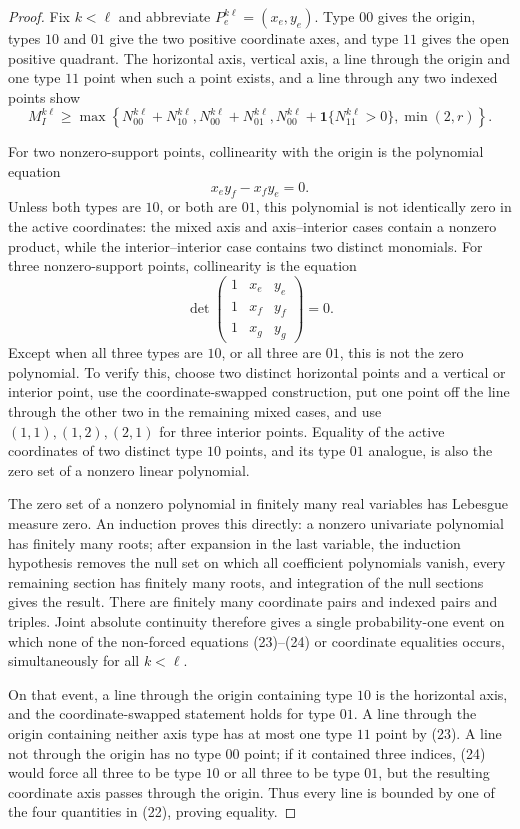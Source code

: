 \documentclass{article}
\begin{document}
\begin{proof}
Fix \(k<\ell\) and abbreviate \(P_e^{k\ell}=(x_e,y_e)\).  Type \(00\) gives the origin, types \(10\) and \(01\) give the two positive coordinate axes, and type \(11\) gives the open positive quadrant.  The horizontal axis, vertical axis, a line through the origin and one type \(11\) point when such a point exists, and a line through any two indexed points show
\[
 M_I^{k\ell}\ge
 \max\!\left\{
 N_{00}^{k\ell}+N_{10}^{k\ell},
 N_{00}^{k\ell}+N_{01}^{k\ell},
 N_{00}^{k\ell}+\mathbf 1\{N_{11}^{k\ell}>0\},
 \min(2,r)
 \right\}. \tag{22}
\]

For two nonzero-support points, collinearity with the origin is the polynomial equation
\[
 x_ey_f-x_fy_e=0. \tag{23}
\]
Unless both types are \(10\), or both are \(01\), this polynomial is not identically zero in the active coordinates: the mixed axis and axis--interior cases contain a nonzero product, while the interior--interior case contains two distinct monomials.  For three nonzero-support points, collinearity is the equation
\[
 \det\!\begin{pmatrix}
 1&x_e&y_e\\
 1&x_f&y_f\\
 1&x_g&y_g
 \end{pmatrix}=0. \tag{24}
\]
Except when all three types are \(10\), or all three are \(01\), this is not the zero polynomial.  To verify this, choose two distinct horizontal points and a vertical or interior point, use the coordinate-swapped construction, put one point off the line through the other two in the remaining mixed cases, and use \((1,1),(1,2),(2,1)\) for three interior points.  Equality of the active coordinates of two distinct type \(10\) points, and its type \(01\) analogue, is also the zero set of a nonzero linear polynomial.

The zero set of a nonzero polynomial in finitely many real variables has Lebesgue measure zero.  An induction proves this directly: a nonzero univariate polynomial has finitely many roots; after expansion in the last variable, the induction hypothesis removes the null set on which all coefficient polynomials vanish, every remaining section has finitely many roots, and integration of the null sections gives the result.  There are finitely many coordinate pairs and indexed pairs and triples.  Joint absolute continuity therefore gives a single probability-one event on which none of the non-forced equations (23)--(24) or coordinate equalities occurs, simultaneously for all \(k<\ell\).

On that event, a line through the origin containing type \(10\) is the horizontal axis, and the coordinate-swapped statement holds for type \(01\).  A line through the origin containing neither axis type has at most one type \(11\) point by (23).  A line not through the origin has no type \(00\) point; if it contained three indices, (24) would force all three to be type \(10\) or all three to be type \(01\), but the resulting coordinate axis passes through the origin.  Thus every line is bounded by one of the four quantities in (22), proving equality.
\end{proof}
\end{document}
